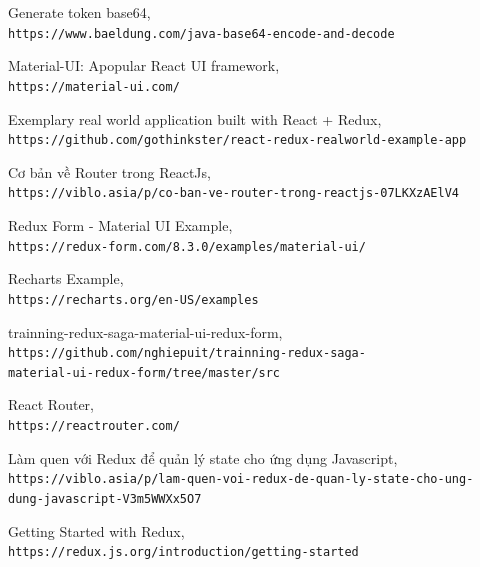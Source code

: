 \documentclass[a4paper,12pt,fleqn,print,oneside]{extarticle}
\begin{document}
\begin{thebibliography}{80}
 Generate token base64, \\\texttt{https://www.baeldung.com/java-base64-encode-and-decode}

 Material-UI: Apopular React UI framework, \\\texttt{https://material-ui.com/} 

 Exemplary real world application built with React + Redux, \\\texttt{https://github.com/gothinkster/react-redux-realworld-example-app}

 Cơ bản về Router trong ReactJs, \\\texttt{https://viblo.asia/p/co-ban-ve-router-trong-reactjs-07LKXzAElV4}

 Redux Form - Material UI Example, \\\texttt{https://redux-form.com/8.3.0/examples/material-ui/}

 Recharts Example, \\\texttt{https://recharts.org/en-US/examples}

 trainning-redux-saga-material-ui-redux-form, \\\texttt{https://github.com/nghiepuit/trainning-redux-saga-}
\\\texttt{material-ui-redux-form/tree/master/src}

 React Router, \\\texttt{https://reactrouter.com/}

 Làm quen với Redux để quản lý state cho ứng dụng Javascript, \\\texttt{https://viblo.asia/p/lam-quen-voi-redux-de-quan-ly-state-cho-ung-}
\\\texttt{dung-javascript-V3m5WWXx5O7}

 Getting Started with Redux, \\\texttt{https://redux.js.org/introduction/getting-started}



\end{thebibliography}
\end{document}
